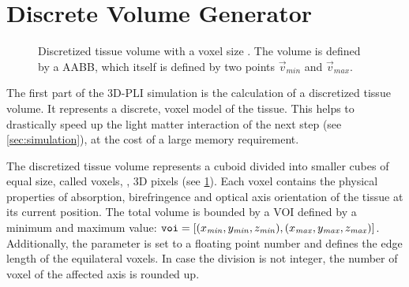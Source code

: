 \section{Discrete Volume Generator}
\label{sec:dv_generator}
%
\begin{figure}[!t]
\centering
\setlength{\tikzwidth}{0.5\textwidth}
\caption{Discretized tissue volume with a voxel size \voxelsize. The volume is defined by a \ac{AABB}, which itself is defined by two points $\vec{v}_\mathit{min}$ and $\vec{v}_\mathit{max}$.}
\label{fig:discVol}
\end{figure}
%
The first part of the \ac{3D-PLI} simulation is the calculation of a discretized tissue volume.
It represents a discrete, voxel model of the tissue.
This helps to drastically speed up the light matter interaction of the next step (see \cref{sec:simulation}), at the cost of a large memory requirement.
\par
%
The discretized tissue volume represents a cuboid divided into smaller cubes of equal size, called voxels, \ie{}, 3D pixels (see \cref{fig:discVol}).
Each voxel contains the physical properties of absorption, birefringence and optical axis orientation of the tissue at its current position.
The total volume is bounded by a \ac{VOI} defined by a minimum and maximum value: $\texttt{voi} = [(x_{\mathit{min}}, y_{\mathit{min}}, z_{\mathit{min}}), (x_{\mathit{max}}, y_{\mathit{max}}, z_{\mathit{max}})]$.
Additionally, the parameter \Voxelsize{} \voxelsize{} is set to a floating point number and defines the edge length of the equilateral voxels.
In case the division is not integer, the number of voxel of the affected axis is rounded up.
%
%
%
